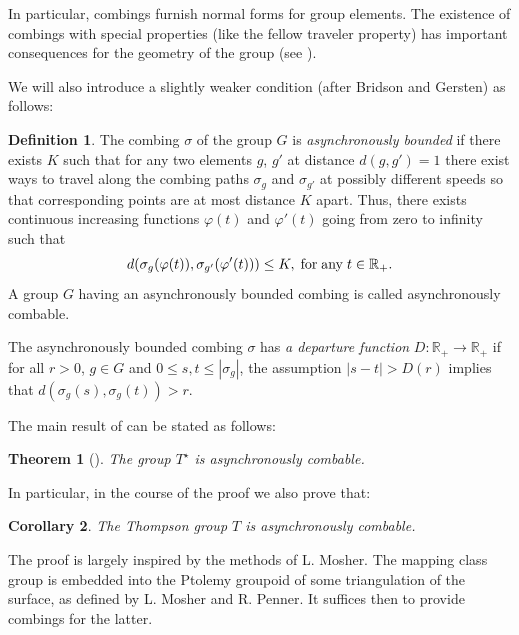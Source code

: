 \documentclass[twoside]{irmaems}
\theoremstyle{plain}
\newtheorem{theorem}{Theorem}[section]
\newtheorem{corollary}[theorem]{Corollary}
\theoremstyle{definition}
\newtheorem{definition}{Definition}[section]
\theoremstyle{remark}
\newcommand{\R}{{\mathbb{R}}}
\begin{document}
\vspace{0.2cm}
\noindent In particular, combings furnish normal forms for 
group elements. 
The existence of combings with special properties (like 
the fellow traveler property) has important consequences for the 
geometry of the group (see \cite{A,Br}).  



\vspace{0.2cm}
\noindent 
We will  also introduce a slightly weaker condition (after 
Bridson and Gersten) as follows:

\begin{definition}
The combing $\sigma$ of the group $G$ is {\em asynchronously bounded} 
if there exists $K$ such that  for any 
two elements $g$, $g'$ at distance $d(g,g')=1$ there exist ways to 
travel along   the combing paths $\sigma_g$ and 
$\sigma_{g'}$ at possibly different speeds so that corresponding  
points are at most distance $K$ apart.  Thus, there exists 
continuous increasing functions $\varphi(t)$ and $\varphi'(t)$ 
going from zero to infinity such that   
\[ d(\sigma_g(\varphi(t)),\sigma_{g'}(\varphi'(t)))\leq K, \; {\rm for \; any }\; t\in \R_+.\]
A group  $G$ having an asynchronously bounded combing is  called asynchronously
combable. 

\vspace{0.1cm}
\noindent
The asynchronously bounded combing $\sigma$ has {\em a departure function} 
$D:\R_+\to \R_+$ if for all $r >0$, $g\in G$ and 
$0\leq s,t\leq |\sigma_g|$, the assumption  $|s-t| > D(r)$ implies that 
$d(\sigma_g(s),\sigma_g(t)) > r$. 
\end{definition}


\vspace{0.1cm}
\noindent
The main result of \cite{fu-ka4} can be stated as follows: 


\begin{theorem}[\cite{fu-ka4}]
The group $T^{\star}$ is asynchronously combable. 
\end{theorem}
 

\noindent  In particular, in the course of the proof we also prove that:

\begin{corollary}
The Thompson group $T$ is asynchronously combable. 
\end{corollary}
 

\noindent The proof is largely inspired by the methods of L. Mosher. 
The mapping class group is embedded into the Ptolemy groupoid of some 
triangulation of the surface, as defined by L. Mosher and R. Penner.  
It suffices then to provide combings for the latter. 
 
\end{document}
